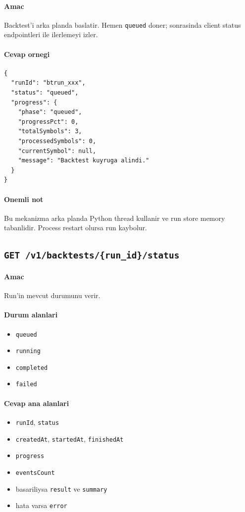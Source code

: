 \documentclass[11pt,a4paper]{article}
\begin{document}
\paragraph{Amac}
Backtest'i arka planda baslatir. Hemen \texttt{queued} doner; sonrasinda client status endpointleri ile ilerlemeyi izler.

\paragraph{Cevap ornegi}
\begin{lstlisting}
{
  "runId": "btrun_xxx",
  "status": "queued",
  "progress": {
    "phase": "queued",
    "progressPct": 0,
    "totalSymbols": 3,
    "processedSymbols": 0,
    "currentSymbol": null,
    "message": "Backtest kuyruga alindi."
  }
}
\end{lstlisting}

\paragraph{Onemli not}
Bu mekanizma arka planda Python thread kullanir ve run store memory tabanlidir. Process restart olursa run kaybolur.

\subsection{\texttt{GET /v1/backtests/\{run\_id\}/status}}

\paragraph{Amac}
Run'in mevcut durumunu verir.

\paragraph{Durum alanlari}
\begin{itemize}[leftmargin=1.5em]
    \item \texttt{queued}
    \item \texttt{running}
    \item \texttt{completed}
    \item \texttt{failed}
\end{itemize}

\paragraph{Cevap ana alanlari}
\begin{itemize}[leftmargin=1.5em]
    \item \texttt{runId}, \texttt{status}
    \item \texttt{createdAt}, \texttt{startedAt}, \texttt{finishedAt}
    \item \texttt{progress}
    \item \texttt{eventsCount}
    \item basariliysa \texttt{result} ve \texttt{summary}
    \item hata varsa \texttt{error}
\end{itemize}
\end{document}
